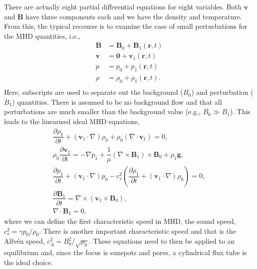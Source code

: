     There are actually eight partial differential equations for eight variables.
    Both $\boldsymbol{{v}}$ and $\boldsymbol{{B}}$ have three components each and we have the density and temperature.
    From this, the typical recourse is to examine the case of small perturbations for the MHD quantities, i.e.,
    \begin{align*}                                                         
        \boldsymbol{{B}} &= \boldsymbol{{B}}_0 + \boldsymbol{{B}}_1(\boldsymbol{r},t)\\               
        \boldsymbol{{v}} &= \boldsymbol{0} + \boldsymbol{{v}}_1(\boldsymbol{r},t)\\               
        p &= p_0 + {p_1}(\boldsymbol{r},t)\\               
        \rho &= \rho_0 + {\rho_1}(\boldsymbol{r},t).\\              
    \end{align*}
    Here, subscripts are used to separate out the background (${B}_0$) and perturbation (${B}_1$) quantities.
    There is assumed to be no background flow and that all perturbations are much smaller than the background value (e.g., ${B}_0 \gg {B}_1$).      
    This leads to the linearised ideal MHD equations,
    \begin{align}                                                         
    \dfrac{\partial \rho_1 }{\partial t} + (\boldsymbol{{v}}_1 \cdot \nabla)\rho_0 + \rho_0 (\nabla \cdot \boldsymbol{{v}}_1) =       
    0,\tag{Mass Conservation}\\                                  
    \rho_0 \dfrac{\partial \boldsymbol{{v}}_1}{\partial t} =
    -\nabla p_1 + \dfrac{1}{\mu}(\nabla \times \boldsymbol{{B}}_1) \times \boldsymbol{{B}}_0 + \rho_1 \boldsymbol{{g}},\tag{Equation of Motion}\\
    \dfrac{\partial p_1}{\partial t} + (\boldsymbol{{v}}_1 \cdot \nabla)p_0 - c_s^2 \left( \dfrac{\partial \rho_1}{\partial t} + (\boldsymbol{{v}}_1 \cdot \nabla)\rho_0 \right) = 0,\tag{Energy Equation}\\       
    \dfrac{\partial \boldsymbol{{B}}_1}{\partial t} = \nabla \times (\boldsymbol{{v}}_1 \times \boldsymbol{{B}}_0),\tag{Induction Equation}\\
    \nabla \cdot \boldsymbol{{B}}_1 = 0, \tag{Solenoid Equation}               
    \end{align}
    where we can define the first characteristic speed in MHD, the sound speed, $c_s^2 = {\gamma p_0}/{\rho_0}$.
    There is another important characteristic speed and that is the Alfv\'{e}n speed, $c_A^2 = {{B}_0^2}/{\sqrt{\rho_0}}$.
    These equations need to then be applied to an equilibrium and, since the focus is sunspots and pores, a cylindrical flux tube is the ideal choice.
    
